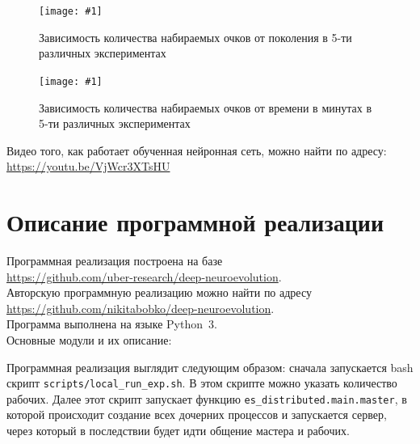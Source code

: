 \documentclass[12pt]{article}
\newcommand{\img}[3]{
    \begin{figure}[H]
        \centering
        \texttt{[image: \#1]}
        \caption{#3}
    \end{figure}
}
\begin{document}
    \img{score_plot.png}{1.0}{Зависимость количества набираемых очков от поколения в 5-ти различных экспериментах}

    \img{score_plot_per_time.png}{1.0}{Зависимость количества набираемых очков от времени в минутах в 5-ти различных экспериментах}

    Видео того, как работает обученная нейронная сеть, можно найти по адресу: \\
    \url{https://youtu.be/VjWcr3XTsHU}

\section{Описание программной реализации}
    Программная реализация построена на базе \\
    \url{https://github.com/uber-research/deep-neuroevolution}. \\
    Авторскую программную реализацию можно найти по адресу \\
    \url{https://github.com/nikitabobko/deep-neuroevolution}. \\
    Программа выполнена на языке Python~3.\\

    Основные модули и их описание:

    Программная реализация выглядит следующим образом: сначала запускается bash скрипт \verb!scripts/local_run_exp.sh!. В этом скрипте можно указать количество рабочих. Далее этот скрипт запускает функцию \verb!es_distributed.main.master!, в которой происходит создание всех дочерних процессов и запускается сервер, через который в последствии будет идти общение мастера и рабочих. \\
\end{document}
